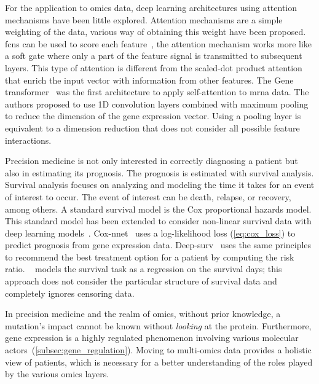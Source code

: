 \documentclass[../main.tex]{subfiles}
\begin{document}
	For the application to omics data, deep learning architectures using attention mechanisms have been little explored.
	Attention mechanisms are a simple weighting of the data, various way of obtaining this weight have been proposed.
	\Glspl{fcn} can be used to score each feature~\cite{Lee2022,beykikhoshkDeepTRIAGEInterpretableIndividualised2020a}, the attention mechanism works more like a soft gate where only a part of the feature signal is transmitted to subsequent layers.
	This type of attention is different from the scaled-dot product attention that enrich the input vector with information from other features.
	The Gene transformer~\cite{Khan2023} was the first architecture to apply self-attention to \gls{mrna} data.
	The authors proposed to use 1D convolution layers combined with maximum pooling to reduce the dimension of the gene expression vector.
	Using a pooling layer is equivalent to a dimension reduction that does not consider all possible feature interactions.

	Precision medicine is not only interested in correctly diagnosing a patient but also in estimating its prognosis.
	The prognosis is estimated with survival analysis.
	Survival analysis focuses on analyzing and modeling the time it takes for an event of interest to occur.
	The event of interest can be death, relapse, or recovery, among others.
	A standard survival model is the Cox proportional hazards model.
	This standard model has been extended to consider non-linear survival data with deep learning models~\cite{katzmanDeepSurvPersonalizedTreatment2018,Ching2018}.
	Cox-nnet~\cite{Ching2018} uses a log-likelihood loss (\cref{eq:cox_loss}) to predict prognosis from gene expression data.
	Deep-surv~\cite{katzmanDeepSurvPersonalizedTreatment2018} uses the same principles to recommend the best treatment option for a patient by computing the risk ratio.
	\citeauthor{Lee2022}~\cite{Lee2022} models the survival task as a regression on the survival days; this approach does not consider the particular structure of survival data and completely ignores censoring data.

	In precision medicine and the realm of omics, without prior knowledge, a mutation's impact cannot be known without \emph{looking} at the protein.
	Furthermore, gene expression is a highly regulated phenomenon involving various molecular actors~(\cref{subsec:gene_regulation}).
	Moving to multi-omics data provides a holistic view of patients, which is necessary for a better understanding of the roles played by the various omics layers.
\end{document}
